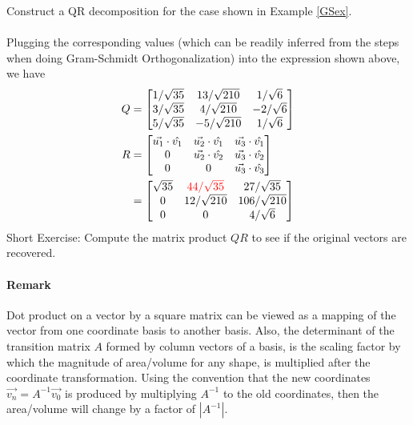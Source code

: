 \begin{exmp}
Construct a QR decomposition for the case shown in Example \ref{GSex}.\\
\\
Plugging the corresponding values (which can be readily inferred from the steps when doing Gram-Schmidt Orthogonalization) into the expression shown above, we have
\begin{align*}
Q &= 
\begin{bmatrix}
1/\sqrt{35} & 13/\sqrt{210} & 1/\sqrt{6} \\
3/\sqrt{35} & 4/\sqrt{210} & -2/\sqrt{6} \\
5/\sqrt{35} & -5/\sqrt{210} & 1/\sqrt{6}
\end{bmatrix} \\
R &= 
\begin{bmatrix}
\vec{u_1} \cdot \hat{v_1} & \vec{u_2} \cdot \hat{v_1} & \vec{u_3} \cdot \hat{v_1} \\
0 & \vec{u_2} \cdot \hat{v_2} & \vec{u_3} \cdot \hat{v_2}  \\
0 & 0 & \vec{u_3} \cdot \hat{v_3} \\
\end{bmatrix} \\
&= 
\begin{bmatrix}
\sqrt{35} & \textcolor{red}{44/\sqrt{35}} & 27/\sqrt{35} \\
0 & 12/\sqrt{210} & 106/\sqrt{210}  \\
0 & 0 & 4/\sqrt{6} \\
\end{bmatrix} 
\end{align*}
Short Exercise: Compute the matrix product $QR$ to see if the original vectors are recovered.
\end{exmp}

\paragraph{Remark}
Dot product on a vector by a square matrix can be viewed as a mapping of the vector from one coordinate basis to another basis. Also, the determinant of the transition matrix $A$ formed by column vectors of a basis, is the scaling factor by which the magnitude of area/volume for any shape, is multiplied after the coordinate transformation. Using the convention that the new coordinates $\vec{v_n} = A^{-1} \vec{v_0}$ is produced by multiplying $A^{-1}$ to the old coordinates, then the area/volume will change by a factor of $|A^{-1}|$. 

